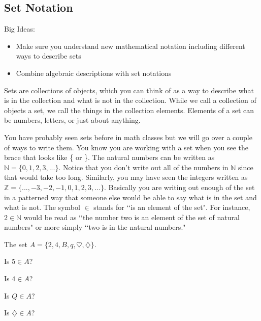 \subsection{Set Notation}
\begin{annotation}
\end{annotation}
Big Ideas:
\begin{itemize}
\item Make sure you understand new mathematical notation including different ways to describe sets
\item Combine algebraic descriptions with set notations
\end{itemize}
\begin{info}
Sets are collections of objects, which you can think of as a way to describe what is in the collection and what is not in the collection. While we call a collection of objects a set, we call the things in the collection elements. Elements of a set can be numbers, letters, or just about anything.

You have probably seen sets before in math classes but we will go over a couple of ways to write them. You know you are working with a set when you see the brace that looks like \{ or \}. The natural numbers can be written as $\mathbb{N} = \{0,1,2,3,... \}$. Notice that you don't write out all of the numbers in $\mathbb{N}$ since that would take too long. Similarly, you may have seen the integers written as $\mathbb{Z}=\{ ...,-3,-2,-1,0,1,2,3,... \}$. Basically you are writing out enough of the set in a patterned way that someone else would be able to say what is in the set and what is not. The symbol $\in$ stands for \lq\lq{is an element of the set}". For instance, $ 2 \in \mathbb{N}$ would be read as \lq\lq{the number two is an element of the set of natural numbers}" or more simply \lq\lq{two is in the natural numbers}."
\end{info}
\bq The set $A=\{2,4,B,q,\heartsuit,\diamondsuit \}$.
\be
\item Is $5 \in A$?
\item Is $4 \in A$?
\item Is $Q \in A$?
\item Is $\diamondsuit \in A$?
\ee
\eq


